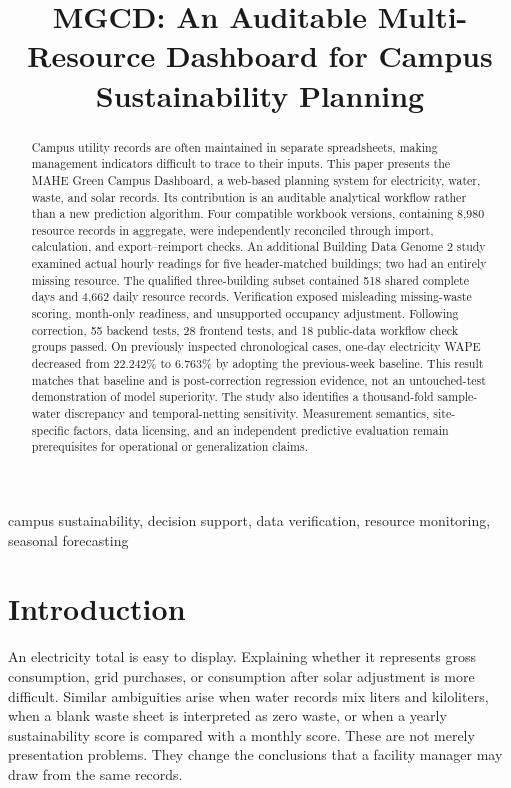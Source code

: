 \documentclass[conference]{IEEEtran}
\title{MGCD: An Auditable Multi-Resource Dashboard for Campus Sustainability Planning}
\author{\IEEEauthorblockN{Author Names to Be Added}
\IEEEauthorblockA{Departments and Affiliations to Be Added\\
City, Country\\Corresponding Author Email to Be Added}}
\begin{document}
\maketitle

\begin{abstract}
Campus utility records are often maintained in separate spreadsheets, making management indicators difficult to trace to their inputs. This paper presents the MAHE Green Campus Dashboard, a web-based planning system for electricity, water, waste, and solar records. Its contribution is an auditable analytical workflow rather than a new prediction algorithm. Four compatible workbook versions, containing 8,980 resource records in aggregate, were independently reconciled through import, calculation, and export--reimport checks. An additional Building Data Genome 2 study examined actual hourly readings for five header-matched buildings; two had an entirely missing resource. The qualified three-building subset contained 518 shared complete days and 4,662 daily resource records. Verification exposed misleading missing-waste scoring, month-only readiness, and unsupported occupancy adjustment. Following correction, 55 backend tests, 28 frontend tests, and 18 public-data workflow check groups passed. On previously inspected chronological cases, one-day electricity WAPE decreased from 22.242\% to 6.763\% by adopting the previous-week baseline. This result matches that baseline and is post-correction regression evidence, not an untouched-test demonstration of model superiority. The study also identifies a thousand-fold sample-water discrepancy and temporal-netting sensitivity. Measurement semantics, site-specific factors, data licensing, and an independent predictive evaluation remain prerequisites for operational or generalization claims.
\end{abstract}

\begin{IEEEkeywords}
campus sustainability, decision support, data verification, resource monitoring, seasonal forecasting
\end{IEEEkeywords}

\section{Introduction}
An electricity total is easy to display. Explaining whether it represents gross consumption, grid purchases, or consumption after solar adjustment is more difficult. Similar ambiguities arise when water records mix liters and kiloliters, when a blank waste sheet is interpreted as zero waste, or when a yearly sustainability score is compared with a monthly score. These are not merely presentation problems. They change the conclusions that a facility manager may draw from the same records.
\end{document}
